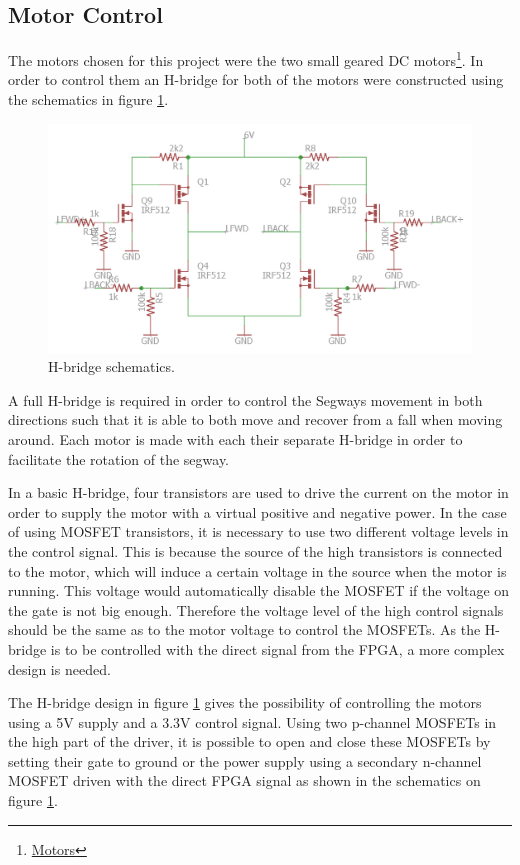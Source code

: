 
\subsection{Motor Control}
The motors chosen for this project were the two small geared DC motors\footnote{ \href{https://www.sparkfun.com/products/13258}{Motors}}.
In order to control them an H-bridge for both of the motors were constructed using the schematics in figure \ref{fig:hbridge}.


\begin{figure}[H]
\centering
\includegraphics[width = 0.8 \textwidth]{images/hbridge_schematics}
\caption{H-bridge schematics.}
\label{fig:hbridge}
\end{figure}

A full H-bridge is required in order to control the Segways movement in both directions such that it is able to both move and recover from a fall when moving around.
Each motor is made with each their separate H-bridge in order to facilitate the rotation of the segway.

In a basic H-bridge, four transistors are used to drive the current on the motor in order to supply the motor with a virtual positive and negative power.
In the case of using MOSFET transistors, it is necessary to use two different voltage levels in the control signal.
This is because the source of the high transistors is connected to the motor, which will induce a certain voltage in the source when the motor is running.
This voltage would automatically disable the MOSFET if the voltage on the gate is not big enough.
Therefore the voltage level of the high control signals should be the same as to the motor voltage to control the MOSFETs.
As the H-bridge is to be controlled with the direct signal from the FPGA, a more complex design is needed.

The H-bridge design in figure \ref{fig:hbridge} gives the possibility of controlling the motors using a 5V supply and a 3.3V control signal.
Using two p-channel MOSFETs in the high part of the driver, it is possible to open and close these MOSFETs by setting their gate to ground or the power supply using a secondary n-channel MOSFET driven with the direct FPGA signal as shown in the schematics on figure \ref{fig:hbridge}.

